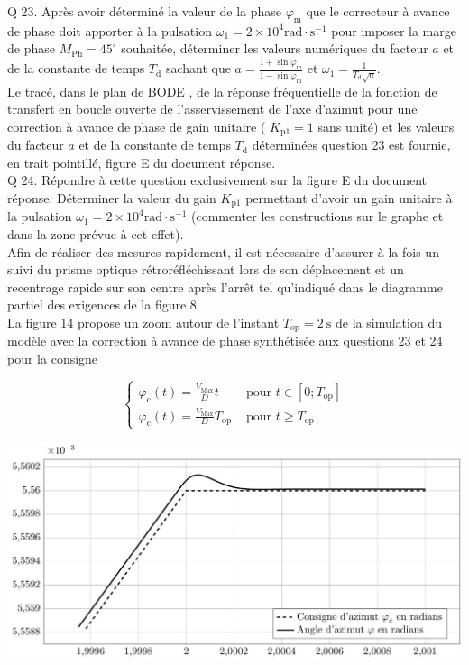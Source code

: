 \documentclass[10pt]{article}
\begin{document}
Q 23. Après avoir déterminé la valeur de la phase $\varphi_{\mathrm{m}}$ que le correcteur à avance de phase doit apporter à la pulsation $\omega_{1}=2 \times 10^{4} \mathrm{rad} \cdot \mathrm{s}^{-1}$ pour imposer la marge de phase $M_{\mathrm{Ph}}=45^{\circ}$ souhaitée, déterminer les valeurs numériques du facteur $a$ et de la constante de temps $T_{\mathrm{d}}$ sachant que $a=\frac{1+\sin \varphi_{\mathrm{m}}}{1-\sin \varphi_{\mathrm{m}}}$ et $\omega_{1}=\frac{1}{T_{\mathrm{d}} \sqrt{a}}$.\\
Le tracé, dans le plan de BODE , de la réponse fréquentielle de la fonction de transfert en boucle ouverte de l'asservissement de l'axe d'azimut pour une correction à avance de phase de gain unitaire ( $K_{\mathrm{p} 1}=1$ sans unité) et les valeurs du facteur $a$ et de la constante de temps $T_{\mathrm{d}}$ déterminées question 23 est fournie, en trait pointillé, figure E du document réponse.\\
Q 24. Répondre à cette question exclusivement sur la figure E du document réponse. Déterminer la valeur du gain $K_{\mathrm{p} 1}$ permettant d'avoir un gain unitaire à la pulsation $\omega_{1}=2 \times 10^{4} \mathrm{rad} \cdot \mathrm{s}^{-1}$ (commenter les constructions sur le graphe et dans la zone prévue à cet effet).\\
Afin de réaliser des mesures rapidement, il est nécessaire d'assurer à la fois un suivi du prisme optique rétroréfléchissant lors de son déplacement et un recentrage rapide sur son centre après l'arrêt tel qu'indiqué dans le diagramme partiel des exigences de la figure 8.\\
La figure 14 propose un zoom autour de l'instant $T_{\mathrm{op}}=2 \mathrm{~s}$ de la simulation du modèle avec la correction à avance de phase synthétisée aux questions 23 et 24 pour la consigne

$$
\begin{cases}\varphi_{\mathrm{c}}(t)=\frac{V_{\mathrm{Max}}}{D} t & \text { pour } t \in\left[0 ; T_{\mathrm{op}}\right] \\ \varphi_{\mathrm{c}}(t)=\frac{V_{\mathrm{Max}}}{D} T_{\mathrm{op}} & \text { pour } t \geqslant T_{\mathrm{op}}\end{cases}
$$

\begin{center}
\includegraphics[max width=\textwidth]{2024_12_07_51b7f57c7f055c2d8d29g-11(1)}
\end{center}
\end{document}
